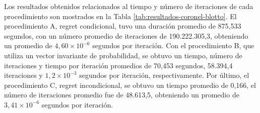 Los resultados obtenidos relacionados al tiempo y número de iteraciones de cada procedimiento son mostrados en la Tabla \ref{tab:resultados-coronel-blotto}.  El procedimiento A, regret condicional, tuvo una duración promedio de 875,533 segundos, con un número promedio de iteraciones de 190.222.305,3, obteniendo un promedio de $4,60 {\times} 10^{-6}$ segundos por iteración. Con el procedimiento B, que utiliza un vector invariante de probabilidad, se obtuvo un tiempo, número de iteraciones y tiempo por iteración promedios de 70,453 segundos, 58.394,4 iteraciones y $1,2 {\times} 10^{-3}$ segundos por iteración, respectivamente. Por último, el procedimiento C, regret incondicional, se obtuvo un tiempo promedio de 0,166, el número de iteraciones promedio fue de 48.613,5, obteniendo un promedio de $3,41 {\times} 10^{-6}$ segundos por iteración.
 

